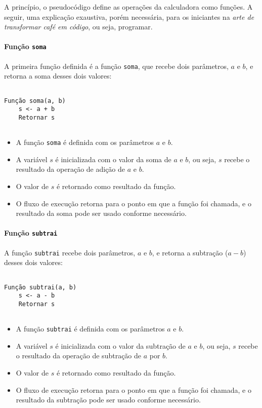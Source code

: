 \documentclass[a4paper, 12pt, onecolumn,singlespacing]{article}
\begin{document}
	A princípio, o pseudocódigo define as operações da calculadora como funções. A seguir, uma explicação exaustiva, porém necessária, para os iniciantes na \textit{arte de transformar café em código}, ou seja, programar.
	
	\paragraph{Função \texttt{soma}} A primeira função definida é a função \texttt{soma}, que recebe dois parâmetros, $a$ e $b$, e retorna a soma desses dois valores:
	
\begin{verbatim}

Função soma(a, b)
	s <- a + b
	Retornar s
	
\end{verbatim}

\begin{itemize}
	\item A função \texttt{soma} é definida com os parâmetros $a$ e $b$.
	\item A variável $s$ é inicializada com o valor da soma de $a$ e $b$, ou seja, $s$ recebe o resultado da operação de adição de $a$ e $b$.
	\item O valor de $s$ é retornado como resultado da função.
	\item O fluxo de execução retorna para o ponto em que a função foi chamada, e o resultado da soma pode ser usado conforme necessário.
\end{itemize}

	\paragraph{Função \texttt{subtrai}} A função \texttt{subtrai} recebe dois parâmetros, $a$ e $b$, e retorna a subtração ($a-b$) desses dois valores:

\begin{verbatim}
	
Função subtrai(a, b)
	s <- a - b
	Retornar s
	
\end{verbatim}

\begin{itemize}
	\item A função \texttt{subtrai} é definida com os parâmetros $a$ e $b$.
	\item A variável $s$ é inicializada com o valor da subtração de $a$ e $b$, ou seja, $s$ recebe o resultado da operação de subtração de $a$ por $b$.
	\item O valor de $s$ é retornado como resultado da função.
	\item O fluxo de execução retorna para o ponto em que a função foi chamada, e o resultado da subtração pode ser usado conforme necessário.
\end{itemize}
\end{document}
